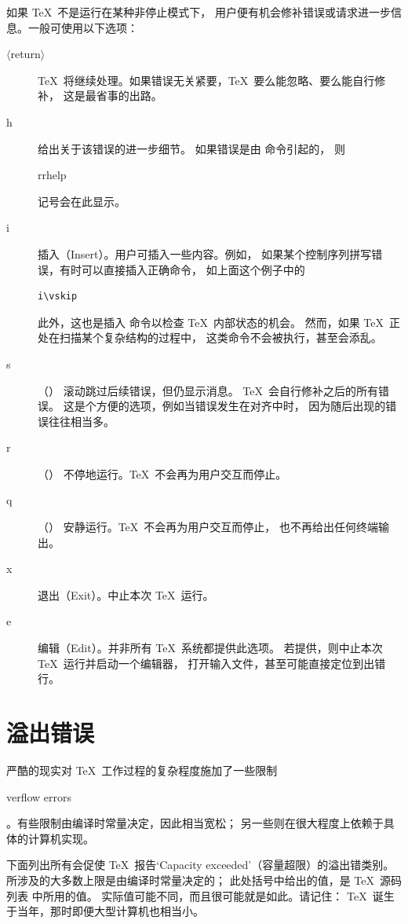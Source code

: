 \documentclass[a4paper]{rapport3}
\makeatletter
\def\gr#1{$\langle$#1$\rangle$}\def\key#1{{\tt#1}}
\def\term#1\par{\index{#1}}
\def\cstoidx#1\par{\index{#1@\cs{#1}}}
\def\csidx#1{\cstoidx #1\par\cs{#1}}
\makeatother
\begin{document}
如果 \TeX\ 不是运行在某种非停止模式下\label{interaction}，
用户便有机会修补错误或请求进一步信息。一般可使用以下选项：
\begin{description}\item [\gr{return}]
\TeX\ 将继续处理。如果错误无关紧要，\TeX\ 要么能忽略、要么能自行修补，
这是最省事的出路。
\item [\n h]
给出关于该错误的进一步细节。
如果错误是由  命令引起的，
则 \csidx{errhelp} 记号会在此显示。
\item [\n i]
插入（Insert）。用户可插入一些内容。例如，
如果某个控制序列拼写错误，有时可以直接插入正确命令，
如上面这个例子中的
\begin{verbatim}
i\vskip
\end{verbatim}
此外，这也是插入  命令以检查 \TeX\ 内部状态的机会。
然而，如果 \TeX\ 正处在扫描某个复杂结构的过程中，
这类命令不会被执行，甚至会添乱。
\item [\n s]
    （）
滚动跳过后续错误，但仍显示消息。
\TeX\ 会自行修补之后的所有错误。
这是个方便的选项，例如当错误发生在对齐中时，
因为随后出现的错误往往相当多。
\item [\n r]
    （）
不停地运行。\TeX\ 不会再为用户交互而停止。
\item [\n q]
    （）
安静运行。\TeX\ 不会再为用户交互而停止，
也不再给出任何终端输出。
\item [\n x]
退出（Exit）。中止本次 \TeX\ 运行。
\item [\n e]
编辑（Edit）。并非所有 \TeX\ 系统都提供此选项。
若提供，则中止本次 \TeX\ 运行并启动一个编辑器，
打开输入文件，甚至可能直接定位到出错行。
\end{description}


\section{溢出错误}

严酷的现实对 \TeX\ 工作过程的复杂程度施加了一些限制
\term overflow errors\par
。有些限制由编译时常量决定，因此相当宽松；
另一些则在很大程度上依赖于具体的计算机实现。

下面列出所有会促使 \TeX\ 报告`Capacity exceeded'（容量超限）的溢出错类别。
所涉及的大多数上限是由编译时常量决定的；
此处括号中给出的值，是 \TeX\ 源码列表 \cite{Knuth:TeXbook} 中所用的值。
实际值可能不同，而且很可能就是如此。请记住：
\TeX\ 诞生于当年，那时即便大型计算机也相当小。

\end{document}

